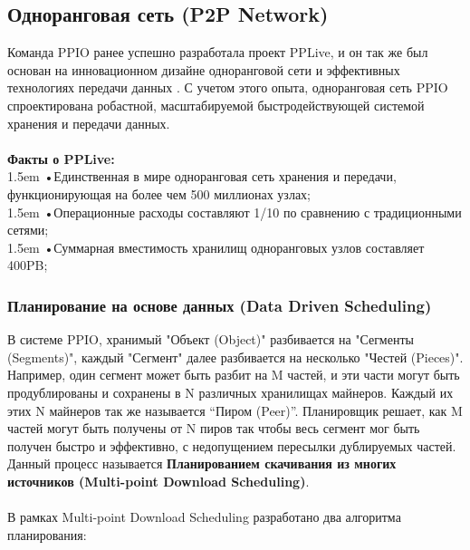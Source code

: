 \documentclass[10pt,a4paper]{article}
\begin{document}
\subsection{Одноранговая сеть (P2P Network)} %
Команда PPIO ранее успешно разработала проект PPLive, и он так же был основан на инновационном дизайне одноранговой сети и эффективных технологиях передачи данных \cite{article4} \cite{article5} \cite{article6} \cite{article7}. С учетом этого опыта, одноранговая сеть PPIO спроектирована робастной, масштабируемой быстродействующей системой хранения и передачи данных.
\vspace{-0.5em}
\\ \\{\bf Факты о PPLive:}
\vspace{-0.8em}
\\ 

\hangindent 1.5em
\noindent   
•\quad Единственная в мире одноранговая сеть хранения и передачи, функционирующая на более чем 500 миллионах узлах;
\vspace{-0.8em}
\\ 

\hangindent 1.5em
\noindent   
•\quad Операционные расходы составляют 1/10 по сравнению с традиционными сетями;
\vspace{-0.8em}
\\ 

\hangindent 1.5em
\noindent   
•\quad Суммарная вместимость хранилищ одноранговых узлов составляет 400PB;
\vspace{-0.5em}

\subsubsection{Планирование на основе данных (Data Driven Scheduling)}  %
В системе PPIO, хранимый "Объект (Object)" разбивается на "Сегменты (Segments)", каждый "Сегмент" далее разбивается на несколько "Честей (Pieces)". Например, один сегмент может быть разбит на M частей, и эти части могут быть продублированы и сохранены в N различных хранилищах майнеров. Каждый их этих N майнеров так же называется “Пиром (Peer)”. Планировщик решает, как M частей могут быть получены от N пиров так чтобы весь сегмент мог быть получен быстро и эффективно, с недопущением пересылки дублируемых частей. Данный процесс называется {\bf Планированием скачивания из многих источников (Multi-point Download Scheduling)}.
\vspace{-0.5em}
\\ \\В рамках Multi-point Download Scheduling разработано два алгоритма планирования:
\vspace{-0.8em}
\\ 
\end{document}
